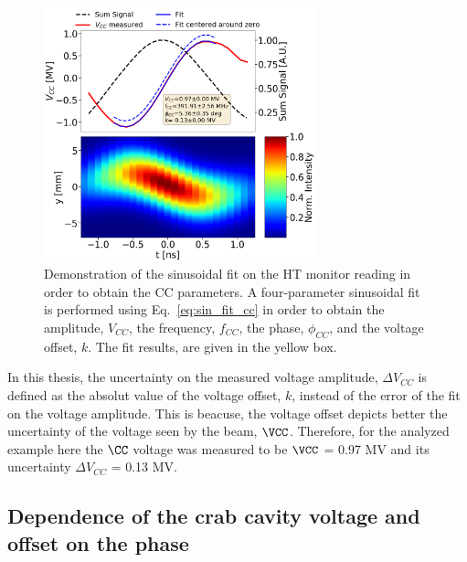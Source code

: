 \begin{figure}[!h]
   \centering         
   \includegraphics[width=0.7\textwidth]{images/Ch4/HT_VCC_callibration_20180530_135105_sin_fit.png}
       \caption{Demonstration of the sinusoidal fit on the HT monitor reading in order to obtain the CC parameters. A four-parameter sinusoidal fit is performed using Eq.~\eqref{eq:sin_fit_cc} in order to obtain the amplitude, $V_{CC}$, the frequency, $f_{CC}$, the phase, $\phi_{CC}$, and the voltage offset, $k$. The fit results, are given in the yellow box.}
       \label{fig:crabbing_sin_fit}
\end{figure}

In this thesis, the uncertainty on the measured voltage amplitude, $\Delta V_{CC}$ is defined as the absolut value of the voltage offset, $k$, instead of the error of the fit on the voltage amplitude. This is beacuse, the voltage offset depicts better the uncertainty of the voltage seen by the beam, $\VCC$. Therefore, for the analyzed example here the $\CC$ voltage was measured to be $\VCC$ = 0.97 MV and its uncertainty $\Delta V_{CC}$ = 0.13 MV. 




\subsection{Dependence of the crab cavity voltage and offset on the phase}

